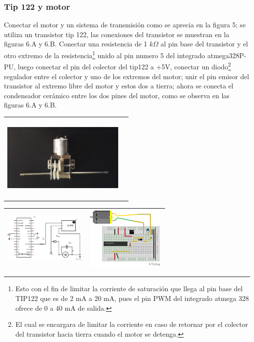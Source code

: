 \documentclass[12]{article}
\newenvironment{Figure}
{\par\medskip\noindent\minipage{\linewidth}}
{\endminipage\par\medskip}
\begin{document}
\begin{multicols}{2}
\subsubsection{Tip 122 y motor}
Conectar el motor y un sistema de transmisión como se aprecia en la figura 5; se utiliza un transistor tip\cite{TIP122} 122, las conexiones del transistor se muestran en la  figuras 6.A y 6.B.
Conectar una resistencia de 1 $k \Omega $ al pin base del transistor y el otro extremo de la resistencia\footnote{Esto con el fin de limitar la corriente de saturación que llega al pin  base del TIP122 que es de 2 mA a 20 mA, pues el pin PWM del integrado atmega 328 ofrece de 0 a 40 mA de salida.}  unido al pin numero 5 del integrado atmega328P-PU, luego conectar el pin del colector del tip122 a +5V, conectar un  diodo\footnote{El cual se encargara de limitar la corriente en caso de retornar por el colector del transistor hacia tierra cuando el motor se detenga.} regulador entre el colector y uno de los extremos del motor; unir el pin emisor del transistor  al extremo libre del motor y estos dos a tierra; ahora se conecta el condensador cerámico entre los dos pines del motor, como se observa en las  figuras 6.A y 6.B.
\begin{Figure}
\center
\begin{tabular}{|l|r|}
\hline
\\
\includegraphics[width=6cm, height=4cm]{img/transmision.png}  \\\\ \hline
\end{tabular}
\label{fig:g5}
\end{Figure}
\begin{Figure}
\center
\begin{tabular}{|l|r|}
\hline
\includegraphics[width=4cm, height=3cm]{img/esquemamotor.png} & \includegraphics[width=4cm, height=3cm]{img/montajemot.png} \\ \hline

\end{tabular}
\end{Figure}
\end{multicols}
\end{document}
